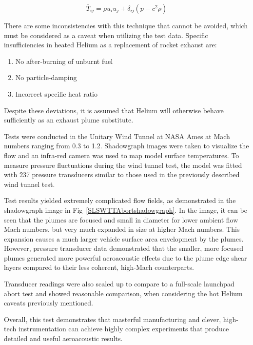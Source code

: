 \documentclass[]{aiaa-tc}%
\begin{document}
\begin{equation}
\overline{T}_{ij} = \rho u_i u_j + \delta_{ij} \left( p - c^2\rho \right)
\label{LighthillStressTensor}
\end{equation}

There are some inconsistencies with this technique that cannot be avoided, which must be considered as a caveat when utilizing the test data.  Specific insufficiencies in heated Helium as a replacement of rocket exhaust are:

\begin{enumerate}
  \item No after-burning of unburnt fuel
  \item No particle-damping
  \item Incorrect specific heat ratio
\end{enumerate}

\noindent Despite these deviations, it is assumed that Helium will otherwise behave sufficiently as an exhaust plume substitute.

Tests were conducted in the Unitary Wind Tunnel at NASA Ames at Mach numbers ranging from 0.3 to 1.2.  Shadowgraph images were taken to visualize the flow and an infra-red camera was used to map model surface temperatures.  To measure pressure fluctuations during the wind tunnel test, the model was fitted with 237 pressure transducers similar to those used in the previously described wind tunnel test.

Test results yielded extremely complicated flow fields, as demonstrated in the shadowgraph image in Fig~\ref{SLSWTTAbortshadowgraph}.  In the image, it can be seen that the plumes are focused and small in diameter for lower ambient flow Mach numbers, but very much expanded in size at higher Mach numbers.  This expansion causes a much larger vehicle surface area envelopment by the plumes.  However, pressure transducer data demonstrated that the smaller, more focused plumes generated more powerful aeroacoustic effects due to the plume edge shear layers compared to their less coherent, high-Mach counterparts.

Transducer readings were also scaled up to compare to a full-scale launchpad abort test and showed reasonable comparison, when considering the hot Helium caveats previously mentioned.

Overall, this test demonstrates that masterful manufacturing and clever, high-tech instrumentation can achieve highly complex experiments that produce detailed and useful aeroacoustic results.
\end{document}
